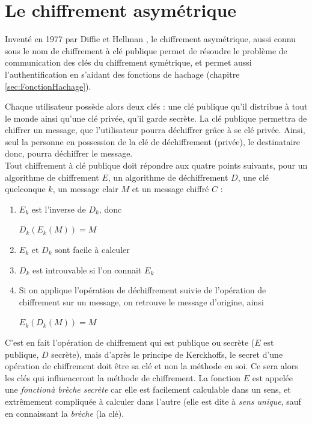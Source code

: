 \section{Le chiffrement asymétrique}
Inventé en 1977 par Diffie et Hellman
\cite{NewDirectionsInCryptography}, le chiffrement asymétrique, aussi
connu sous le nom de chiffrement à clé publique permet de résoudre le
problème de communication des clés du chiffrement symétrique, et
permet aussi l'authentification en s'aidant des fonctions de hachage 
(chapitre \ref{sec:FonctionHachage}). 

Chaque utilisateur possède alors deux clés : une clé publique qu'il
distribue à tout le monde ainsi qu'une clé privée, qu'il garde
secrète. La clé publique permettra de chiffrer un message, que
l'utilisateur pourra déchiffrer grâce à se clé privée. Ainsi, seul la
personne en possession de la clé de déchiffrement (privée), le
destinataire donc, pourra déchiffrer le message. \\

Tout chiffrement à clé publique doit répondre aux quatre points
suivants, pour un algorithme de chiffrement $E$, un algorithme de
déchiffrement $D$, une clé quelconque $k$, un message clair $M$ et un
message chiffré $C$ : 
\begin{enumerate}
  \item $E_k$ est l'inverse de $D_k$, donc
    \begin{center}
      $D_k(E_k(M)) = M$
    \end{center}
  \item $E_k$ et $D_k$ sont facile à calculer
  \item $D_k$ est introuvable si l'on connait $E_k$
  \item Si on applique l'opération de déchiffrement suivie de
    l'opération de chiffrement sur un message, on retrouve le message
    d'origine, ainsi
    \begin{center}
      $E_k(D_k(M)) = M$
    \end{center}
\end{enumerate}

C'est en fait l'opération de chiffrement qui est publique ou secrète
($E$ est publique, $D$ secrète), mais d'après le principe de
Kerckhoffs, le secret d'une opération de chiffrement doit être sa clé
et non la méthode en soi. Ce sera alors les clés qui influenceront
la méthode de chiffrement. La fonction $E$ est appelée une
\emph{fonctionà brèche secrète} %
car elle est facilement calculable dans un sens, et extrêmement
compliquée à calculer dans l'autre (elle est dite à \emph{sens unique},
sauf en connaissant la \emph{brèche} (la clé).

